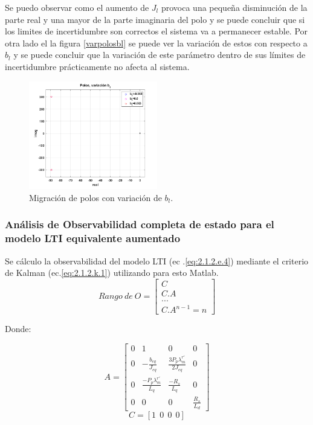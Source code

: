 \documentclass[10pt]{article}
\begin{document}
\begin{itemize}
	Se puedo observar como el aumento de $J_{l}$ provoca una pequeña disminución de la parte real y una mayor de la parte imaginaria del polo y se puede concluir que si los limites de incertidumbre son correctos el sistema va a permanecer estable. Por otra lado el la figura \ref{varpolosbl} se puede ver la variación de estos con respecto a $b_{l}$ y se puede concluir que la variación de este parámetro dentro de sus límites de incertidumbre prácticamente no afecta al sistema.
	
	\begin{figure}[h!]
	\centering
	\includegraphics[width=0.5\textwidth]{varpolosbl.png}
	\caption{\label{fig:varpolosbl} Migración de polos con variación de $b_{l}$.}
	\end{figure}
	

\end{itemize}
\subsubsection{Análisis de Observabilidad completa de estado para el modelo LTI equivalente aumentado}
Se cálculo la observabilidad del modelo LTI (ec .\ref{eq:2.1.2.e.4}) mediante el criterio de Kalman (ec.\ref{eq:2.1.2.k.1}) utilizando para esto Matlab.
	\begin{equation}
	Rango \ de\  O=
	\begin{bmatrix}
	
		C\\ 
		C.A\\ 
		...\\ 
		C.A^{n-1}=n
		\end{bmatrix}
	\label{eq:2.1.2.k.1}
	\end{equation}
	
	Donde:
	
		\begin{equation}
		A=\begin{bmatrix}
	0 & 1 &0 &0 \\ 
	0 & -\frac{b_{eq}}{J_{eq}} & \frac{3 P_{p} \lambda^{r'}_{m}}{2 J_{eq}} & 0 \\ 
	0  & \frac{- P_{p} \lambda^{r'}_{m}}{ L_{q}} & \frac{-R_{s}}{L_{q}}&0\\
	0&0&0&\frac{R_{s}}{L_{d}}
	\end{bmatrix}
	\label{eq:2.1.2.k.2}
	\end{equation}
	\begin{equation}
		C=[1 \ \ 0 \ \ 0 \ \ 0 ] 
	\label{eq:2.1.2.k.3}
	\end{equation}
	
\end{document}
